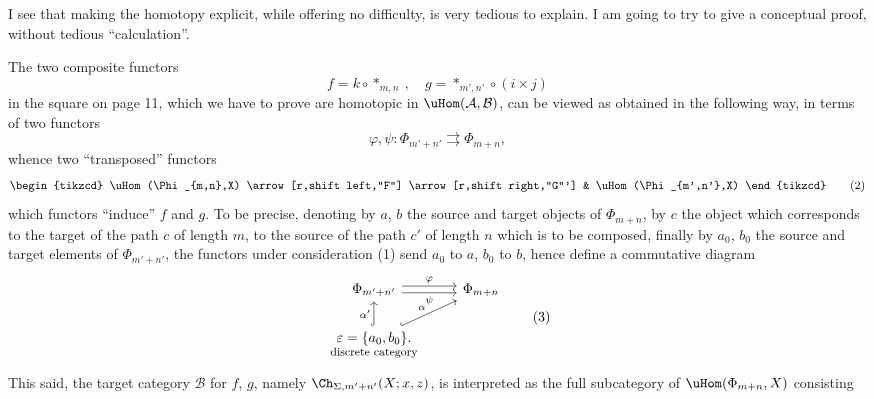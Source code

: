 I see that making the homotopy explicit, while offering no difficulty, is very tedious to explain. I am going to try to give a conceptual proof, without tedious ``calculation''.



The two composite functors
\[
f=k\circ *_{m,n}\ ,\quad g=*_{m',n'}\circ(i\times j)
\]
in the square on page 11, which we have to prove are homotopic in $\uHom(\mathcal{A},\mathcal{B})$, can be viewed as obtained in the following way, in terms of two functors
\[
\varphi,\psi:\Phi_{m'+n'}\rightrightarrows\Phi_{m+n}, \tag*{(1)}
\]
whence two ``transposed'' functors
\[
\begin{tikzcd}
\uHom(\Phi_{m,n},X) \arrow[r,shift left,"F"] \arrow[r,shift right,"G"'] & \uHom(\Phi_{m',n'},X)
\end{tikzcd} \tag*{(2)}
\]
 which functors ``induce'' $f$ and $g$. To be precise, denoting by $a$, $b$ the source and target objects of $\Phi_{m+n}$, by $c$ the object which corresponds to the target of the path $c$ of length $m$, to the source of the path $c'$ of length $n$ which is to be composed, finally by $a_0$, $b_0$ the source and target elements of $\Phi_{m'+n'}$, the functors under consideration (1) send $a_0$ to $a$, $b_0$ to $b$, hence define a commutative diagram
\[
\begin{tikzcd}
\Phi_{m'+n'} \arrow[r,shift left,"\varphi"] \arrow[r,shift right,"\psi"'] & \Phi_{m+n} \\
\underset{\text{\footnotesize discrete category}}{\varepsilon=\{a_0,b_0\}.} \arrow[u,hook,"\alpha'"] \arrow[ur,hook,"\alpha"] &
\end{tikzcd} \tag*{(3)}
\]
This said, the target category $\mathcal{B}$ for $f$, $g$, namely $\Ch_{\Sigma,m'+n'}(X;x,z)$, is interpreted as the full subcategory of $\uHom(\Phi_{m+n},X)$ consisting

